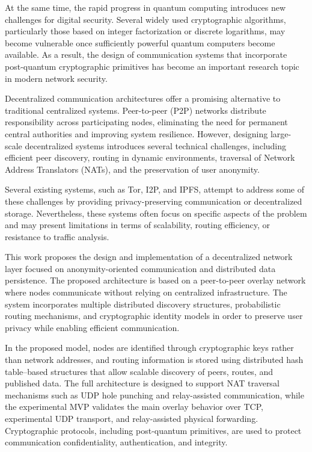\documentclass[
  12pt,
  oneside,
  a4paper,
  chapter=TITLE,
  section=TITLE,
  english,
  brazil
]{abntex2}
\begin{document}
At the same time, the rapid progress in quantum computing introduces new challenges for digital security. Several widely used cryptographic algorithms, particularly those based on integer factorization or discrete logarithms, may become vulnerable once sufficiently powerful quantum computers become available. As a result, the design of communication systems that incorporate post-quantum cryptographic primitives has become an important research topic in modern network security.

Decentralized communication architectures offer a promising alternative to traditional centralized systems. Peer-to-peer (P2P) networks distribute responsibility across participating nodes, eliminating the need for permanent central authorities and improving system resilience. However, designing large-scale decentralized systems introduces several technical challenges, including efficient peer discovery, routing in dynamic environments, traversal of Network Address Translators (NATs), and the preservation of user anonymity.

Several existing systems, such as Tor, I2P, and IPFS, attempt to address some of these challenges by providing privacy-preserving communication or decentralized storage. Nevertheless, these systems often focus on specific aspects of the problem and may present limitations in terms of scalability, routing efficiency, or resistance to traffic analysis.

This work proposes the design and implementation of a decentralized network layer focused on anonymity-oriented communication and distributed data persistence. The proposed architecture is based on a peer-to-peer overlay network where nodes communicate without relying on centralized infrastructure. The system incorporates multiple distributed discovery structures, probabilistic routing mechanisms, and cryptographic identity models in order to preserve user privacy while enabling efficient communication.

In the proposed model, nodes are identified through cryptographic keys rather than network addresses, and routing information is stored using distributed hash table--based structures that allow scalable discovery of peers, routes, and published data. The full architecture is designed to support NAT traversal mechanisms such as UDP hole punching and relay-assisted communication, while the experimental MVP validates the main overlay behavior over TCP, experimental UDP transport, and relay-assisted physical forwarding. Cryptographic protocols, including post-quantum primitives, are used to protect communication confidentiality, authentication, and integrity.
\end{document}
